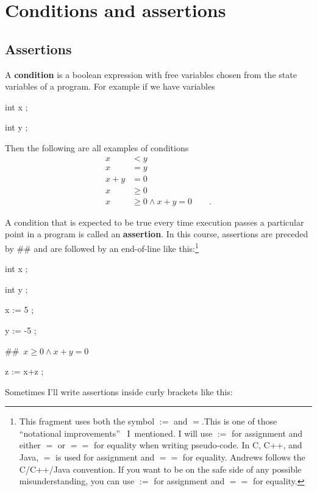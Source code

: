 \documentclass[11pt]{article}%
\begin{document}
\section{Conditions and assertions\label{assertions}}

\subsection{Assertions}

A \textbf{condition} is a boolean expression with free variables chosen from
the state variables of a program. For example if we have variables

\begin{code}
int x ;

int y ;
\end{code}

Then the following are all examples of conditions%
\begin{align*}
x  &  <y\\
x  &  =y\\
x+y  &  =0\\
x  &  \geq0\\
x  &  \geq0\wedge x+y=0\qquad\text{.}%
\end{align*}


A condition that is expected to be true every time execution passes a
particular point in a program is called an \textbf{assertion}. In this course,
assertions are preceded by \#\# and are followed by an end-of-line like
this:\footnote{This fragment uses both the symbol $:=$ and $=$.This is one of
those \textquotedblleft notational improvements\textquotedblright%
\ I\ mentioned. I will use $:=$ for assignment and either $=$ or $==$ for
equality when writing pseudo-code. In C, C++, and Java, $=$ is used for
assignment and $==$ for equality. Andrews follows the C/C++/Java convention.
If you want to be on the safe side of any possible misunderstanding, you can
use $:=$ for assignment and $==$ for equality.}

\begin{code}
int x ;

int y ;

x := 5 ;

y := -5 ;

\#\#\ $x\geq0\wedge x+y=0$

z := x+z ;
\end{code}

Sometimes I'll write assertions inside curly brackets like this:
\end{document}
